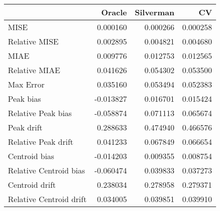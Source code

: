 \begin{tabular}{lrrr}
  \hline
 & Oracle & Silverman & CV \\ 
  \hline
MISE & 0.000160 & 0.000266 & 0.000258 \\ 
  Relative MISE & 0.002895 & 0.004821 & 0.004680 \\ 
  MIAE & 0.009776 & 0.012753 & 0.012565 \\ 
  Relative MIAE & 0.041626 & 0.054302 & 0.053500 \\ 
  Max Error & 0.035160 & 0.053494 & 0.052383 \\ 
  Peak bias & -0.013827 & 0.016701 & 0.015424 \\ 
  Relative Peak bias & -0.058874 & 0.071113 & 0.065674 \\ 
  Peak drift & 0.288633 & 0.474940 & 0.466576 \\ 
  Relative Peak drift & 0.041233 & 0.067849 & 0.066654 \\ 
  Centroid bias & -0.014203 & 0.009355 & 0.008754 \\ 
  Relative Centroid bias & -0.060474 & 0.039833 & 0.037273 \\ 
  Centroid drift & 0.238034 & 0.278958 & 0.279371 \\ 
  Relative Centroid drift & 0.034005 & 0.039851 & 0.039910 \\ 
   \hline
\end{tabular}
